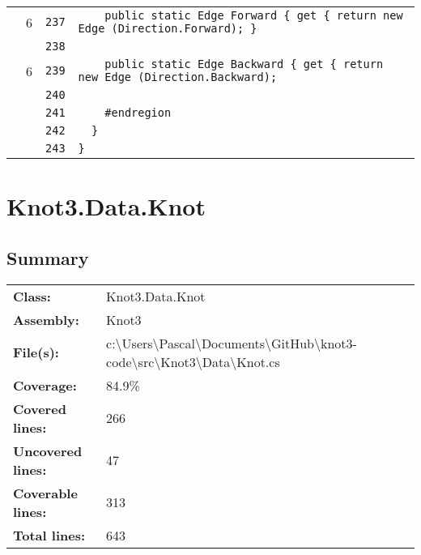\documentclass[a4paper,10pt]{article}
\begin{document}
\begin{longtable}[l]{lrrl}
\cellcolor{green} & 6 & \verb~237~ & \verb~    public static Edge Forward { get { return new Edge (Direction.Forward); } ~\\
\cellcolor{gray} &  & \verb~238~ & \verb~~\\
\cellcolor{green} & 6 & \verb~239~ & \verb~    public static Edge Backward { get { return new Edge (Direction.Backward); ~\\
\cellcolor{gray} &  & \verb~240~ & \verb~~\\
\cellcolor{gray} &  & \verb~241~ & \verb~    #endregion~\\
\cellcolor{gray} &  & \verb~242~ & \verb~  }~\\
\cellcolor{gray} &  & \verb~243~ & \verb~}~\\
\end{longtable}
\newpage
\section{Knot3.Data.Knot}
\subsection{Summary}
\begin{longtable}[l]{ll}
\textbf{Class:} & Knot3.Data.Knot\\
\textbf{Assembly:} & Knot3\\
\textbf{File(s):} & \begin{minipage}[t]{12cm}{c:\textbackslash Users\textbackslash Pascal\textbackslash Documents\textbackslash GitHub\textbackslash knot3-code\textbackslash src\textbackslash Knot3\textbackslash Data\textbackslash Knot.cs}\end{minipage} \\
\textbf{Coverage:} & 84.9\%\\
\textbf{Covered lines:} & 266\\
\textbf{Uncovered lines:} & 47\\
\textbf{Coverable lines:} & 313\\
\textbf{Total lines:} & 643\\
\end{longtable}
\end{document}
